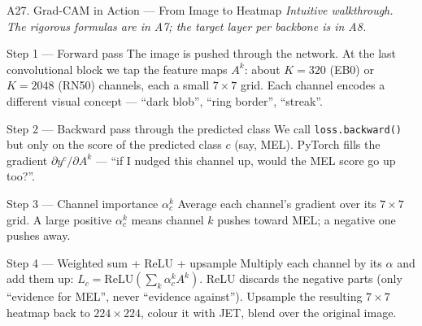 \documentclass[10pt, aspectratio=169]{beamer}
\begin{document}
\begin{frame}{A27. Grad-CAM in Action --- From Image to Heatmap}
    \footnotesize
    \textit{Intuitive walkthrough. The rigorous formulas are in A7; the target layer per backbone is in A8.}
    \vspace{0.2cm}

    \begin{block}{Step 1 --- Forward pass}
        \scriptsize
        The image is pushed through the network. At the last convolutional block we tap the feature maps $A^k$: about $K=320$ (EB0) or $K=2048$ (RN50) channels, each a small $7 \times 7$ grid. Each channel encodes a different visual concept --- ``dark blob'', ``ring border'', ``streak''.
    \end{block}

    \begin{block}{Step 2 --- Backward pass through the predicted class}
        \scriptsize
        We call \texttt{loss.backward()} but only on the score of the predicted class $c$ (say, MEL). PyTorch fills the gradient $\partial y^c / \partial A^k$ --- ``if I nudged this channel up, would the MEL score go up too?''.
    \end{block}

    \begin{block}{Step 3 --- Channel importance $\alpha_c^k$}
        \scriptsize
        Average each channel's gradient over its $7 \times 7$ grid. A large positive $\alpha_c^k$ means channel $k$ pushes toward MEL; a negative one pushes away.
    \end{block}

    \begin{block}{Step 4 --- Weighted sum + ReLU + upsample}
        \scriptsize
        Multiply each channel by its $\alpha$ and add them up: $L_c = \mathrm{ReLU}(\sum_k \alpha_c^k A^k)$. ReLU discards the negative parts (only ``evidence for MEL'', never ``evidence against''). Upsample the resulting $7 \times 7$ heatmap back to $224 \times 224$, colour it with JET, blend over the original image.
    \end{block}

\end{frame}
\end{document}
